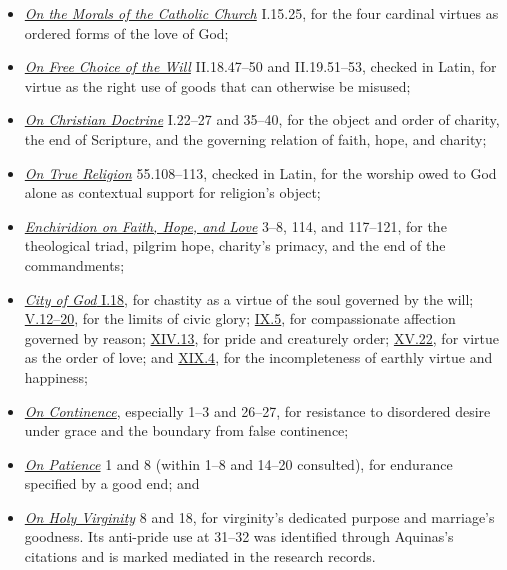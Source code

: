 \begin{itemize}[leftmargin=1.4em,itemsep=0.35em]
  \item \href{https://www.newadvent.org/fathers/1401.htm}{\emph{On the Morals of the Catholic Church}} I.15.25, for the four cardinal virtues as ordered forms of the love of God;
  \item \href{https://www.augustinus.it/latino/libero_arbitrio/libero_arbitrio_2_libro.htm}{\emph{On Free Choice of the Will}} II.18.47--50 and II.19.51--53, checked in Latin, for virtue as the right use of goods that can otherwise be misused;
  \item \href{https://www.newadvent.org/fathers/12021.htm}{\emph{On Christian Doctrine}} I.22--27 and 35--40, for the object and order of charity, the end of Scripture, and the governing relation of faith, hope, and charity;
  \item \href{https://www.augustinus.it/latino/vera_religione/vera_religione_libro.htm}{\emph{On True Religion}} 55.108--113, checked in Latin, for the worship owed to God alone as contextual support for religion's object;
  \item \href{https://www.newadvent.org/fathers/1302.htm}{\emph{Enchiridion on Faith, Hope, and Love}} 3--8, 114, and 117--121, for the theological triad, pilgrim hope, charity's primacy, and the end of the commandments;
  \item \href{https://www.newadvent.org/fathers/120101.htm}{\emph{City of God} I.18}, for chastity as a virtue of the soul governed by the will; \href{https://www.newadvent.org/fathers/120105.htm}{V.12--20}, for the limits of civic glory; \href{https://www.newadvent.org/fathers/120109.htm}{IX.5}, for compassionate affection governed by reason; \href{https://www.newadvent.org/fathers/120114.htm}{XIV.13}, for pride and creaturely order; \href{https://www.newadvent.org/fathers/120115.htm}{XV.22}, for virtue as the order of love; and \href{https://www.newadvent.org/fathers/120119.htm}{XIX.4}, for the incompleteness of earthly virtue and happiness;
  \item \href{https://www.newadvent.org/fathers/1308.htm}{\emph{On Continence}}, especially 1--3 and 26--27, for resistance to disordered desire under grace and the boundary from false continence;
  \item \href{https://www.newadvent.org/fathers/1315.htm}{\emph{On Patience}} 1 and 8 (within 1--8 and 14--20 consulted), for endurance specified by a good end; and
  \item \href{https://www.newadvent.org/fathers/1310.htm}{\emph{On Holy Virginity}} 8 and 18, for virginity's dedicated purpose and marriage's goodness. Its anti-pride use at 31--32 was identified through Aquinas's citations and is marked mediated in the research records.
\end{itemize}

